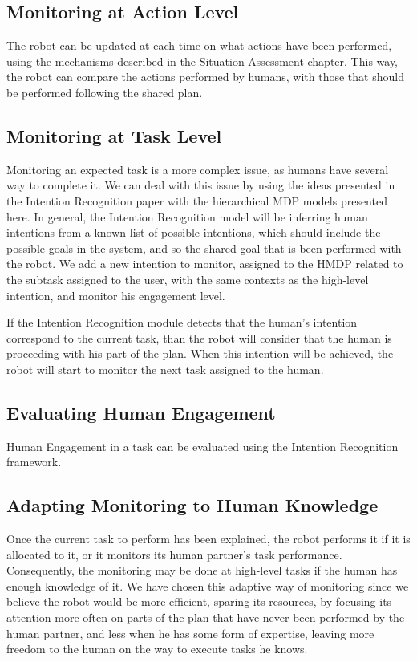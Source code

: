 \subsection{Monitoring at Action Level}
The robot can be updated at each time on what actions have been performed, using the mechanisms described in the Situation Assessment chapter. This way, the robot can compare the actions performed by humans, with those that should be performed following the shared plan.

\subsection{Monitoring at Task Level}
Monitoring an expected task is a more complex issue, as humans have several way to complete it. We can deal with this issue by using the ideas presented in the Intention Recognition paper with the hierarchical MDP models presented here. In general, the Intention Recognition model will be inferring human intentions from a known list of possible intentions, which should include the possible goals in the system, and so the shared goal that is been performed with the robot. We add a new intention to monitor, assigned to the HMDP related to the subtask assigned to the user, with the same contexts as the high-level intention, and monitor his engagement level.

 If the Intention Recognition module detects that the human's intention correspond to the current task, than the robot will consider that the human is proceeding with his part of the plan. When this intention will be achieved, the robot will start to monitor the next task assigned to the human.

\subsection{Evaluating Human Engagement}
Human Engagement in a task can be evaluated using the Intention Recognition framework. %

\subsection{Adapting Monitoring to Human Knowledge}
Once the current task to perform has been explained, the robot performs it if it is allocated to it, or it  monitors its human partner's task performance. Consequently, the monitoring may be done at high-level tasks if the human has enough knowledge of it.
We have chosen this adaptive way of monitoring since we believe the robot would be more efficient, sparing its resources, by focusing its attention more often on parts of the plan that have never been performed by the human partner, and less when he has some form of expertise, leaving more freedom to the human on the way to execute tasks he knows.

